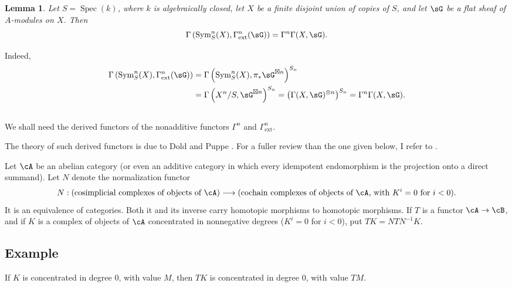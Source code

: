 \documentclass[12pt,oneside,english]{smfbook}
\DeclareMathOperator{\spec}{Spec}
\newtheorem{lemma_}[subsection]{Lemma}
\begin{document}
\begin{lemma_}\label{III:1-3}
Let $S=\spec(k)$, where $k$ is algebraically closed, let $X$ be a finite disjoint union of copies of $S$, and let $\sG$ be a flat sheaf of $A$-modules on $X$. Then
\[
  \Gamma\left(\operatorname{Sym}_S^n(X),\Gamma_\text{ext}^n(\sG)\right) = \Gamma^n \Gamma(X,\sG) \text{.}
\]
\end{lemma_}

Indeed,
\begin{align*}
  \Gamma\left(\operatorname{Sym}_S^n(X),\Gamma_\text{ext}^n(\sG)\right)
    &= \Gamma\left(\operatorname{Sym}_S^n(X),\pi_*\sG^{\boxtimes n}\right)^{S_n} \\
    &= \Gamma\left(X^n/S,\sG^{\boxtimes n}\right)^{S_n}
    = \left(\Gamma(X,\sG)^{\otimes n}\right)^{S_n}
    = \Gamma^n \Gamma(X,\sG) \text{.}
\end{align*}

\subsection{}\label{III:1-4}

We shall need the derived functors of the nonadditive functors $\Gamma^n$ and $\Gamma_\text{ext}^n$.

The theory of such derived functors is due to Dold and Puppe \cite{do61}. For a fuller review than the one given below, I refer to \cite[XVII 5.5.3]{sga4}.

Let $\cA$ be an abelian category (or even an additive category in which every idempotent endomorphism is the projection onto a direct summand). Let $N$ denote the normalization functor
\[
  N:(\text{cosimplicial complexes of objects of $\cA$})
  \longrightarrow
  (\text{cochain complexes of objects of $\cA$, with $K^i=0$ for $i<0$}).
\]
It is an equivalence of categories. Both it and its inverse carry homotopic morphisms to homotopic morphisms. If $T$ is a functor $\cA\to\cB$, and if $K$ is a complex of objects of $\cA$ concentrated in nonnegative degrees ($K^i=0$ for $i<0$), put $T K=N T N^{-1}K$.

\subsection{Example}\label{III:1-5}

If $K$ is concentrated in degree $0$, with value $M$, then $TK$ is concentrated in degree $0$, with value $TM$.

\subsection{}\label{III:1-6}
\end{document}
